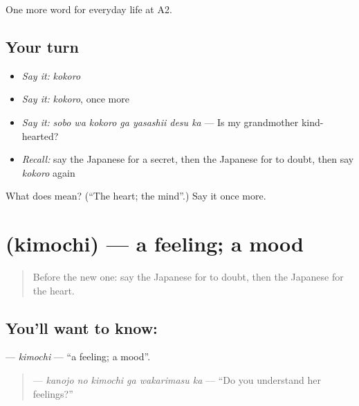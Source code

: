 \begin{grammarlens}[title={What you've built}]
One more word for everyday life at A2.
\end{grammarlens}

\subsection*{Your turn}
\begin{itemize}
\raggedright
  \item \emph{Say it:} \emph{kokoro}
  \item \emph{Say it:} \emph{kokoro}, once more
  \item \emph{Say it:} \emph{sobo wa kokoro ga yasashii desu ka} — Is my grandmother kind-hearted?
  \item \emph{Recall:} say the Japanese for a secret, then the Japanese for to doubt, then say \emph{kokoro} again
\end{itemize}

\begin{tcolorbox}[breakable,colback=teal!4,colframe=teal!35!black,title={Before you move on}]
What does  mean? (\textquotedblleft{}The heart; the mind\textquotedblright{}.) Say it once more.
\end{tcolorbox}
\section[\texorpdfstring{\ja{きもち} (kimochi)}{きもち (kimochi)}]{ (kimochi) — a feeling; a mood}

\label{lesson:JA-C249-kimochi}



\begin{quote}
Before the new one: say the Japanese for to doubt, then the Japanese for the heart.
\end{quote}

\subsection*{You'll want to know: }
\textbf{} — \emph{kimochi} — \textquotedblleft{}a feeling; a mood\textquotedblright{}.

\begin{quote}
\textbf{  } — \emph{kanojo no kimochi ga wakarimasu ka} — \textquotedblleft{}Do you understand her feelings?\textquotedblright{}
\end{quote}

